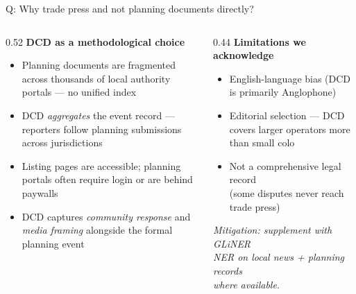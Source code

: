 \documentclass[aspectratio=169,11pt]{beamer}
\begin{document}
\appendix

\begin{frame}[noframenumbering]{\enspace Q: Why trade press and not planning documents directly?}
\begin{columns}[T]
\begin{column}{0.52\textwidth}
  \small\textbf{DCD as a methodological choice}\\[0.4em]
  \footnotesize
  \begin{itemize}
    \item Planning documents are fragmented across thousands of local authority portals — no unified index
    \item DCD \textit{aggregates} the event record — reporters follow planning submissions across jurisdictions
    \item Listing pages are accessible; planning portals often require login or are behind paywalls
    \item DCD captures \textit{community response} and \textit{media framing} alongside the formal planning event
  \end{itemize}
\end{column}
\begin{column}{0.44\textwidth}
  \small\textbf{Limitations we acknowledge}\\[0.4em]
  \footnotesize
  \begin{itemize}
    \item English-language bias (DCD is primarily Anglophone)
    \item Editorial selection — DCD covers larger operators more than small colo
    \item Not a comprehensive legal record\\
          (some disputes never reach trade press)
  \end{itemize}
  \vspace{0.3em}
  \textcolor{dcgray}{\textit{Mitigation: supplement with GLiNER\\NER on local news + planning records\\where available.}}
\end{column}
\end{columns}
\end{frame}
\end{document}
